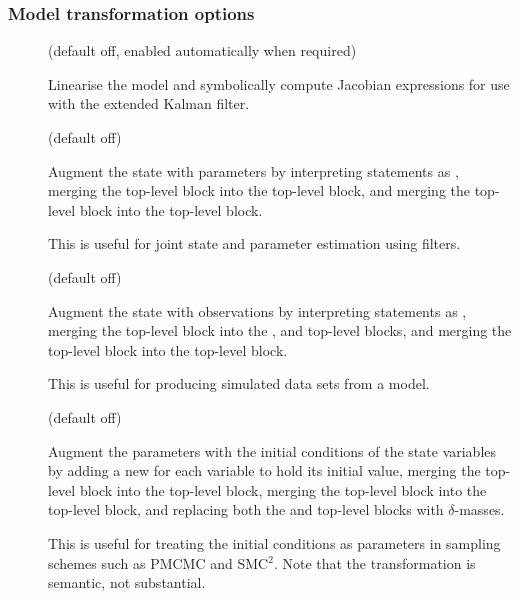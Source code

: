 \subsubsection{Model transformation options}
\begin{description}
\item[] (default off, enabled automatically when
  required)

Linearise the model and symbolically compute Jacobian expressions for use with
the extended Kalman filter.

\item[] (default off)

Augment the state with parameters by interpreting  statements as
, merging the  top-level block into the
 top-level block, and merging the
 top-level block into the
 top-level block.

This is useful for joint state and parameter estimation using filters.

\item[] (default off)

Augment the state with observations by interpreting  statements as
, merging the  top-level block into the
,  and 
top-level blocks, and merging the  top-level
block into the  top-level block.

This is useful for producing simulated data sets from a model.

\item[] (default off)

Augment the parameters with the initial conditions of the state variables by
adding a new  for each  variable to hold its initial
value, merging the  top-level block into the
 top-level block, merging the 
top-level block into the  top-level block, and
replacing both the  and
 top-level blocks with $\delta$-masses.

This is useful for treating the initial conditions as parameters in sampling
schemes such as PMCMC and SMC$^2$. Note that the transformation is semantic,
not substantial.

\end{description}
